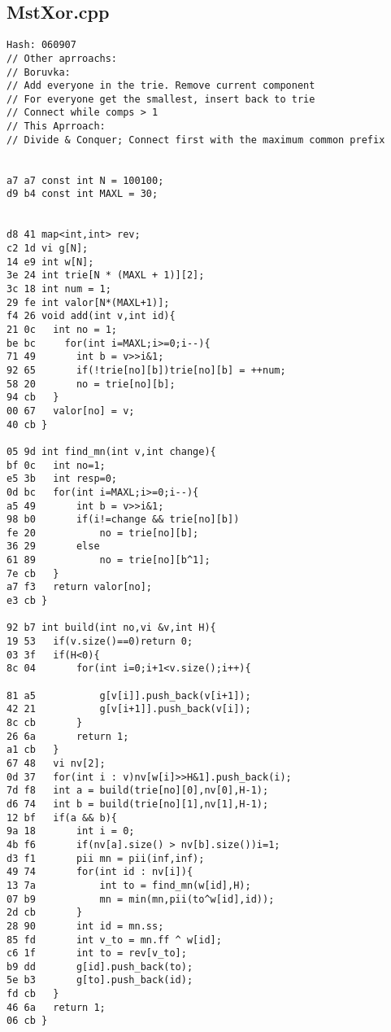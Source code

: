 \documentclass[11pt, a4paper, twoside]{article}
\begin{document}
\subsection{MstXor.cpp}
\begin{lstlisting}
Hash: 060907
// Other aprroachs:
// Boruvka:
// Add everyone in the trie. Remove current component
// For everyone get the smallest, insert back to trie
// Connect while comps > 1
// This Aprroach:
// Divide & Conquer; Connect first with the maximum common prefix


a7 a7 const int N = 100100;
d9 b4 const int MAXL = 30;


d8 41 map<int,int> rev; 
c2 1d vi g[N];
14 e9 int w[N];
3e 24 int trie[N * (MAXL + 1)][2];
3c 18 int num = 1;
29 fe int valor[N*(MAXL+1)];
f4 26 void add(int v,int id){
21 0c 	int no = 1;
be bc     for(int i=MAXL;i>=0;i--){
71 49 		int b = v>>i&1;
92 65 		if(!trie[no][b])trie[no][b] = ++num;
58 20 		no = trie[no][b];
94 cb 	}
00 67 	valor[no] = v;
40 cb }

05 9d int find_mn(int v,int change){
bf 0c 	int no=1;
e5 3b 	int resp=0;
0d bc 	for(int i=MAXL;i>=0;i--){
a5 49 		int b = v>>i&1;
98 b0 		if(i!=change && trie[no][b])
fe 20 			no = trie[no][b];
36 29 		else
61 89 			no = trie[no][b^1];
7e cb 	}
a7 f3 	return valor[no];
e3 cb }

92 b7 int build(int no,vi &v,int H){
19 53 	if(v.size()==0)return 0;
03 3f 	if(H<0){
8c 04 		for(int i=0;i+1<v.size();i++){
      			
81 a5 			g[v[i]].push_back(v[i+1]);
42 21 			g[v[i+1]].push_back(v[i]);
8c cb 		}
26 6a 		return 1;
a1 cb 	}
67 48 	vi nv[2];
0d 37 	for(int i : v)nv[w[i]>>H&1].push_back(i);
7d f8 	int a = build(trie[no][0],nv[0],H-1);
d6 74 	int b = build(trie[no][1],nv[1],H-1);
12 bf 	if(a && b){
9a 18 		int i = 0;
4b f6 		if(nv[a].size() > nv[b].size())i=1;
d3 f1 		pii mn = pii(inf,inf);
49 74 		for(int id : nv[i]){
13 7a 			int to = find_mn(w[id],H);
07 b9 			mn = min(mn,pii(to^w[id],id));
2d cb 		}
28 90 		int id = mn.ss;
85 fd 		int v_to = mn.ff ^ w[id];
c6 1f 		int to = rev[v_to];
b9 dd 		g[id].push_back(to);
5e b3 		g[to].push_back(id);
fd cb 	}
46 6a 	return 1;
06 cb }
\end{lstlisting}
\end{document}
